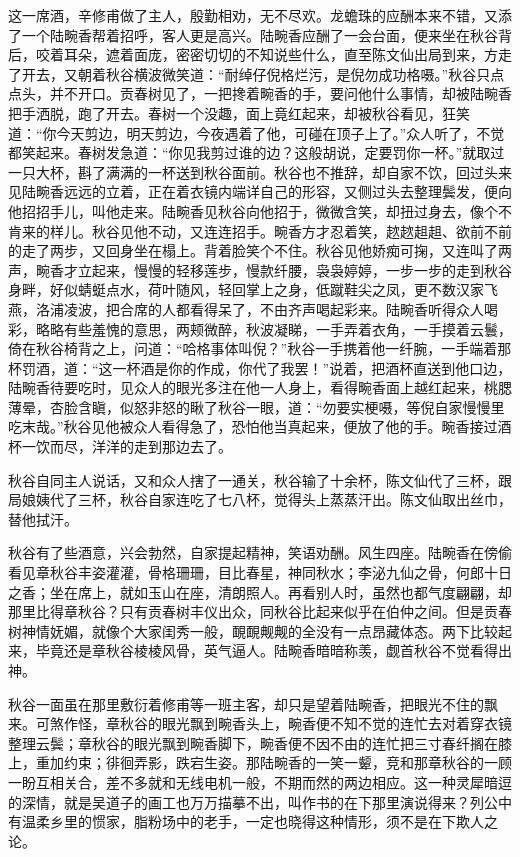 \documentclass[12pt,UTF8]{ctexbook}
\begin{document}
{{{这一席酒，辛修甫做了主人，殷勤相劝，无不尽欢。龙蟾珠的应酬本来不错，又添了一个陆畹香帮着招呼，客人更是高兴。陆畹香应酬了一会台面，便来坐在秋谷背后，咬着耳朵，遮着面庞，密密切切的不知说些什么，直至陈文仙出局到来，方走了开去，又朝着秋谷横波微笑道：“耐绰仔倪格烂污，是倪勿成功格嗫。”秋谷只点点头，并不开口。贡春树见了，一把搀着畹香的手，要问他什么事情，却被陆畹香把手洒脱，跑了开去。春树一个没趣，面上竟红起来，却被秋谷看见，狂笑道：“你今天剪边，明天剪边，今夜遇着了他，可碰在顶子上了。”众人听了，不觉都笑起来。春树发急道：“你见我剪过谁的边？这般胡说，定要罚你一杯。”就取过一只大杯，斟了满满的一杯送到秋谷面前。秋谷也不推辞，却自家不饮，回过头来见陆畹香远远的立着，正在着衣镜内端详自己的形容，又侧过头去整理鬓发，便向他招招手儿，叫他走来。陆畹香见秋谷向他招于，微微含笑，却扭过身去，像个不肯来的样儿。秋谷见他不动，又连连招手。畹香方才忍着笑，趑趑趄趄、欲前不前的走了两步，又回身坐在榻上。背着脸笑个不住。秋谷见他娇痴可掬，又连叫了两声，畹香才立起来，慢慢的轻移莲步，慢款纤腰，袅袅婷婷，一步一步的走到秋谷身畔，好似蜻蜓点水，荷叶随风，轻回掌上之身，低蹴鞋尖之凤，更不数汉家飞燕，洛浦凌波，把合席的人都看得呆了，不由齐声喝起彩来。陆畹香听得众人喝彩，略略有些羞愧的意思，两颊微醉，秋波凝睇，一手弄着衣角，一手摸着云鬟，倚在秋谷椅背之上，问道：“哈格事体叫倪？”秋谷一手携着他一纤腕，一手端着那杯罚酒，道：“这一杯酒是你的作成，你代了我罢！”说着，把酒杯直送到他口边，陆畹香待要吃时，见众人的眼光多注在他一人身上，看得畹香面上越红起来，桃腮薄晕，杏脸含瞋，似怒非怒的瞅了秋谷一眼，道：“勿要实梗嗫，等倪自家慢慢里吃末哉。”秋谷见他被众人看得急了，恐怕他当真起来，便放了他的手。畹香接过酒杯一饮而尽，洋洋的走到那边去了。

秋谷自同主人说话，又和众人搳了一通关，秋谷输了十余杯，陈文仙代了三杯，跟局娘姨代了三杯，秋谷自家连吃了七八杯，觉得头上蒸蒸汗出。陈文仙取出丝巾，替他拭汗。

秋谷有了些酒意，兴会勃然，自家提起精神，笑语劝酬。风生四座。陆畹香在傍偷看见章秋谷丰姿灌灌，骨格珊珊，目比春星，神同秋水；李泌九仙之骨，何郎十日之香；坐在席上，就如玉山在座，清朗照人。再看别人时，虽然也都气度翩翩，却那里比得章秋谷？只有贡春树丰仪出众，同秋谷比起来似乎在伯仲之间。但是贡春树神情妩媚，就像个大家闺秀一般，靦靦觍觍的全没有一点昂藏体态。两下比较起来，毕竟还是章秋谷棱棱风骨，英气逼人。陆畹香暗暗称羡，觑首秋谷不觉看得出神。

秋谷一面虽在那里敷衍着修甫等一班主客，却只是望着陆畹香，把眼光不住的飘来。可煞作怪，章秋谷的眼光飘到畹香头上，畹香便不知不觉的连忙去对着穿衣镜整理云鬓；章秋谷的眼光飘到畹香脚下，畹香便不因不由的连忙把三寸春纤搁在膝上，重加约束；徘徊弄影，跌宕生姿。那陆畹香的一笑一颦，竞和那章秋谷的一顾一盼互相关合，差不多就和无线电机一般，不期而然的两边相应。这一种灵犀暗逗的深情，就是吴道子的画工也万万描摹不出，叫作书的在下那里演说得来？列公中有温柔乡里的惯家，脂粉场中的老手，一定也晓得这种情形，须不是在下欺人之论。

}}}
\end{document}
